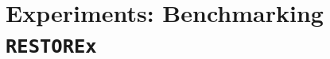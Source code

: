 \documentclass[letterpaper]{article} %
\newcommand{\dataset}{\texttt{RESTOR\textbf{Ex}}}
\newcommand{\model}{\textit{MAMA-Memeia}}
\begin{document}





\section{Experiments: Benchmarking \dataset}
\label{sec:results}


\end{document}
